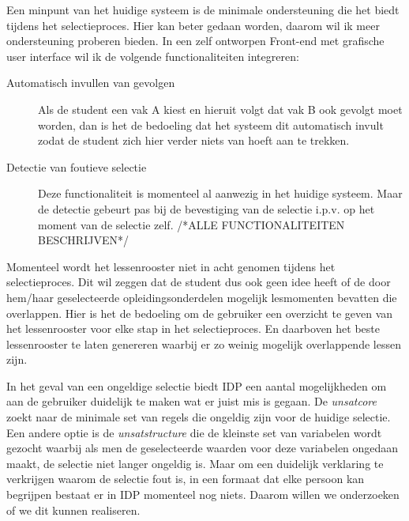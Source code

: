 Een minpunt van het huidige systeem is de minimale ondersteuning die het biedt tijdens het selectieproces. Hier kan beter gedaan worden, daarom wil ik meer ondersteuning proberen bieden. In een zelf ontworpen Front-end met grafische user interface wil ik de volgende functionaliteiten integreren:
\begin{description}
\item[Automatisch invullen van gevolgen] Als de student een vak A kiest en hieruit volgt dat vak B ook gevolgt moet worden, dan is het de bedoeling dat het systeem dit automatisch invult zodat de student zich hier verder niets van hoeft aan te trekken. 
\item[Detectie van foutieve selectie] Deze functionaliteit is momenteel al aanwezig in het huidige systeem. Maar de detectie gebeurt pas bij de bevestiging van de selectie i.p.v. op het moment van de selectie zelf. 
/*ALLE FUNCTIONALITEITEN BESCHRIJVEN*/
\end{description}


Momenteel wordt het lessenrooster niet in acht genomen tijdens het selectieproces. Dit wil zeggen dat de student dus ook geen idee heeft of de door hem/haar geselecteerde opleidingsonderdelen mogelijk lesmomenten bevatten die overlappen. Hier is het de bedoeling om de gebruiker een overzicht te geven van het lessenrooster voor elke stap in het selectieproces. En daarboven het beste lessenrooster te laten genereren waarbij er zo weinig mogelijk overlappende lessen zijn.

In het geval van een ongeldige selectie biedt IDP een aantal mogelijkheden om aan de gebruiker duidelijk te maken wat er juist mis is gegaan. De \emph{unsatcore} zoekt naar de minimale set van regels die ongeldig zijn voor de huidige selectie. Een andere optie is de \emph{unsatstructure} die de kleinste set van variabelen wordt gezocht waarbij als men de geselecteerde waarden voor deze variabelen ongedaan maakt, de selectie niet langer ongeldig is. Maar om een duidelijk verklaring te verkrijgen waarom de selectie fout is, in een formaat dat elke persoon kan begrijpen bestaat er in IDP momenteel nog niets. Daarom willen we onderzoeken of we dit kunnen realiseren.

